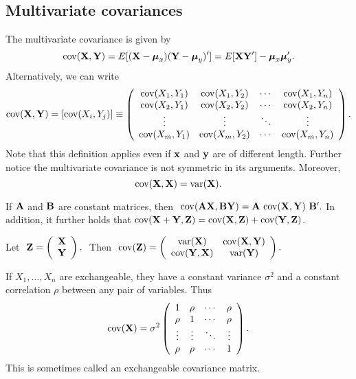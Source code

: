 \subsection{Multivariate covariances}


The multivariate covariance is given by 
$$
\mathrm{cov}(\mathbf{X}, \mathbf{Y}) = E[(\mathbf{X} - \boldsymbol{\mu}_x)(\mathbf{Y} - \boldsymbol{\mu}_y)']
= E[\mathbf{X} \mathbf{Y}'] - \boldsymbol{\mu}_x \boldsymbol{\mu}_y'.
$$
Alternatively, we can write
\begin{eqnarray*}
\mathrm{cov}(\mathbf{X},\mathbf{Y})=[\mathrm{cov}(X_i,Y_j)]
\equiv
\left(\begin{array}{cccc}
	\mathrm{cov}(X_1,Y_1)&\mathrm{cov}(X_1,Y_2)&\cdots&\mathrm{cov}(X_1,Y_n)\\
	\mathrm{cov}(X_2,Y_1)&\mathrm{cov}(X_2,Y_2)&\cdots&\mathrm{cov}(X_2,Y_n)\\
	\vdots&\vdots&\ddots&\vdots\\
	\mathrm{cov}(X_m,Y_1)&\mathrm{cov}(X_m,Y_2)&\cdots&\mathrm{cov}(X_m,Y_n)\\
\end{array}\right).
\end{eqnarray*}
Note that this definition applies even if $\mathbf{x}$ and $\mathbf{y}$ are of different length.
Further notice the multivariate covariance is not symmetric in its arguments. 
Moreover, 
$$
\mathrm{cov}(\mathbf{X}, \mathbf{X}) = \mathrm{var}(\mathbf{X}).
$$


If $\mathbf{A}$ and $\mathbf{B}$ are constant matrices, then
$\ \cov(\bfA\bfX,\bfB\bfY) = \bfA\ \cov(\bfX,\bfY)\ \bfB'.$
In addition, it further holds that $\mathrm{cov}(\mathbf{X} + \mathbf{Y}, \mathbf{Z}) = \mathrm{cov}(\mathbf{X}, \mathbf{Z}) + \mathrm{cov}(\mathbf{Y}, \mathbf{Z})$.


\btheo
Let $\ \mathbf{Z}=\left(\begin{array}{c}\mathbf{X}\\ \mathbf{Y}\\\end{array}\right).\ $
Then
$\ \cov(\bfZ)=
\left(\begin{array}{cc}
	\var(\bfX)&\cov(\bfX,\bfY)\\
	\cov(\bfY,\bfX)&\var(\bfY)\\
\end{array}\right).$
\etheo


\bexa
If $X_1,\ldots,X_n$ are exchangeable, they have a constant variance
$\sigma^2$ and a constant correlation $\rho$ between any pair of
variables.  Thus
$$\mathrm{cov}(\mathbf{X})=\sigma^2
\left(\begin{array}{cccc}
	1&\rho&\cdots&\rho\\
	\rho&1&\cdots&\rho\\
	\vdots&\vdots&\ddots&\vdots\\
	\rho&\rho&\cdots&1\\
\end{array}\right).  $$
This is sometimes called an exchangeable covariance matrix.
\eexa



